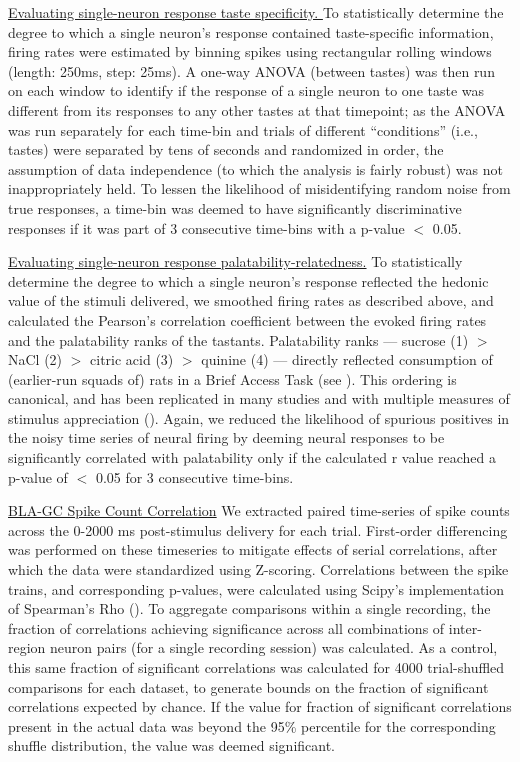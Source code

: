 \begin{refsection}
\noindent\underline{Evaluating single-neuron response taste specificity. }
To statistically determine the degree to which a single neuron’s response contained taste-specific information, firing rates were estimated by binning spikes using rectangular rolling windows (length: 250ms, step: 25ms). A one-way ANOVA (between tastes) was then run on each window to identify if the response of a single neuron to one taste was different from its responses to any other tastes at that timepoint; as the ANOVA was run separately for each time-bin and trials of different “conditions” (i.e., tastes) were separated by tens of seconds and randomized in order, the assumption of data independence (to which the analysis is fairly robust) was not inappropriately held. To lessen the likelihood of misidentifying random noise from true responses, a time-bin was deemed to have significantly discriminative responses if it was part of 3 consecutive time-bins with a p-value \(<\) 0.05.

\noindent\underline{Evaluating single-neuron response palatability-relatedness.} To statistically determine the degree to which a single neuron’s response reflected the hedonic value of the stimuli delivered, we smoothed firing rates as described above, and calculated the Pearson’s correlation coefficient between the evoked firing rates and the palatability ranks of the tastants. Palatability ranks — sucrose (1) \(>\) NaCl (2) \(>\) citric acid (3) \(>\) quinine (4) — directly reflected consumption of (earlier-run squads of) rats in a Brief Access Task (see \cite{sadacca2012a}). This ordering is canonical, and has been replicated in many studies and with multiple measures of stimulus appreciation (\cite{travers1986a,clarke1998a,fontanini2006a}). Again, we reduced the likelihood of spurious positives in the noisy time series of neural firing by deeming neural responses to be significantly correlated with palatability only if the calculated r value reached a p-value of \(<\) 0.05 for 3 consecutive time-bins.

\noindent\underline{BLA-GC Spike Count Correlation}
We extracted paired time-series of spike counts across the 0-2000 ms post-stimulus delivery for each trial. First-order differencing was performed on these timeseries to mitigate effects of serial correlations, after which the data were standardized using Z-scoring. Correlations between the spike trains, and corresponding p-values, were calculated using Scipy’s implementation of Spearman’s Rho (\cite{p2020a}). To aggregate comparisons within a single recording, the fraction of correlations achieving significance across all combinations of inter-region neuron pairs (for a single recording session) was calculated. As a control, this same fraction of significant correlations was calculated for 4000 trial-shuffled comparisons for each dataset, to generate bounds on the fraction of significant correlations expected by chance. If the value for fraction of significant correlations present in the actual data was beyond the 95\% percentile for the corresponding shuffle distribution, the value was deemed significant. 


\end{refsection}
